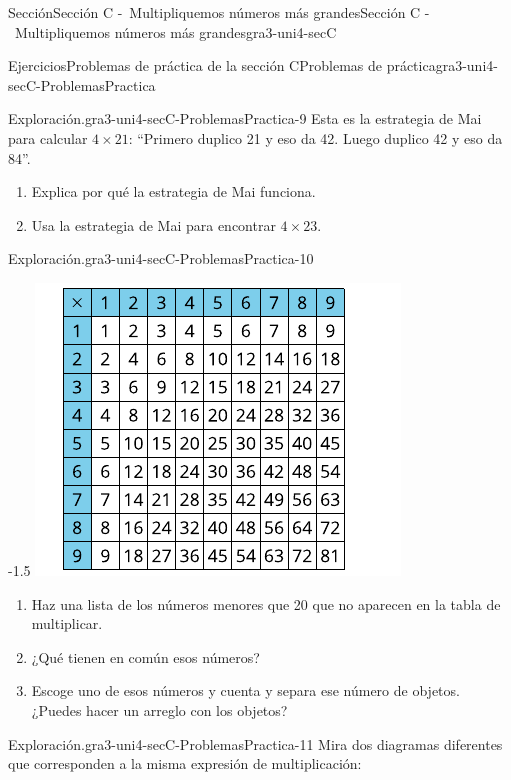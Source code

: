 \documentclass[twoside,10pt,]{article}
\begin{document}
\begin{sectionptx}{Sección}{Sección C -~Multipliquemos números más grandes}{}{Sección C -~Multipliquemos números más grandes}{}{}{gra3-uni4-secC}
\begin{exercises-subsection}{Ejercicios}{Problemas de práctica de la sección C}{}{Problemas de práctica}{}{}{gra3-uni4-secC-ProblemasPractica}
\begin{divisionexercise}{7}{Exploración.}{}{gra3-uni4-secC-ProblemasPractica-9}
Esta es la estrategia de Mai para calcular \(4 \times 21\): “Primero duplico 21 y eso da 42. Luego duplico 42 y eso da 84”.%
%
\begin{enumerate}[label=(\alph*)]
\item{}Explica por qué la estrategia de Mai funciona.%
\item{}Usa la estrategia de Mai para encontrar \(4 \times 23\).%
\end{enumerate}
\end{divisionexercise}%
\begin{divisionexercise}{8}{Exploración.}{}{gra3-uni4-secC-ProblemasPractica-10}%
\begin{image}{0}{1}{0}{-1.5\baselineskip}%
\includegraphics[width=\linewidth]{external/svg-source/tikz-file-151679.pdf}
\end{image}%
%
\begin{enumerate}[label=(\alph*)]
\item{}Haz una lista de los números menores que 20 que no aparecen en la tabla de multiplicar.%
\item{}¿Qué tienen en común esos números?%
\item{}Escoge uno de esos números y cuenta y separa ese número de objetos. ¿Puedes hacer un arreglo con los objetos?%
\end{enumerate}
\end{divisionexercise}%
\begin{divisionexercise}{9}{Exploración.}{}{gra3-uni4-secC-ProblemasPractica-11}%
Mira dos diagramas diferentes que corresponden a la misma expresión de multiplicación:%

\end{divisionexercise}
\end{exercises-subsection}
\end{sectionptx}
\end{document}
